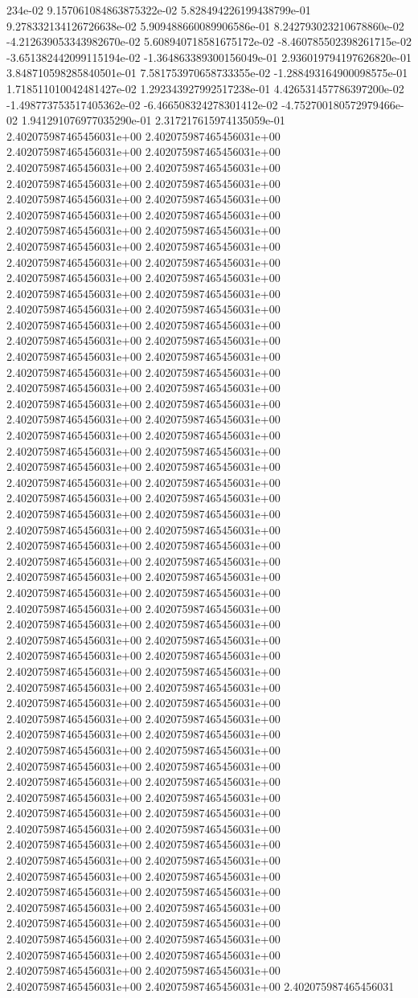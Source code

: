 234e-02	9.157061084863875322e-02	5.828494226199438799e-01	9.278332134126726638e-02	5.909488660089906586e-01	8.242793023210678860e-02	-4.212639053343982670e-02	5.608940718581675172e-02	-8.460785502398261715e-02	-3.651382442099115194e-02	-1.364863389300156049e-01	2.936019794197626820e-01	3.848710598285840501e-01	7.581753970658733355e-02	-1.288493164900098575e-01	1.718511010042481427e-02	1.292343927992517238e-01	4.426531457786397200e-02	-1.498773753517405362e-02	-6.466508324278301412e-02	-4.752700180572979466e-02	1.941291076977035290e-01	2.317217615974135059e-01
2.402075987465456031e+00	2.402075987465456031e+00	2.402075987465456031e+00	2.402075987465456031e+00	2.402075987465456031e+00	2.402075987465456031e+00	2.402075987465456031e+00	2.402075987465456031e+00	2.402075987465456031e+00	2.402075987465456031e+00	2.402075987465456031e+00	2.402075987465456031e+00	2.402075987465456031e+00	2.402075987465456031e+00	2.402075987465456031e+00	2.402075987465456031e+00	2.402075987465456031e+00	2.402075987465456031e+00	2.402075987465456031e+00	2.402075987465456031e+00	2.402075987465456031e+00	2.402075987465456031e+00	2.402075987465456031e+00	2.402075987465456031e+00	2.402075987465456031e+00	2.402075987465456031e+00	2.402075987465456031e+00	2.402075987465456031e+00	2.402075987465456031e+00	2.402075987465456031e+00	2.402075987465456031e+00	2.402075987465456031e+00	2.402075987465456031e+00	2.402075987465456031e+00	2.402075987465456031e+00	2.402075987465456031e+00	2.402075987465456031e+00	2.402075987465456031e+00	2.402075987465456031e+00	2.402075987465456031e+00	2.402075987465456031e+00	2.402075987465456031e+00	2.402075987465456031e+00	2.402075987465456031e+00	2.402075987465456031e+00	2.402075987465456031e+00	2.402075987465456031e+00	2.402075987465456031e+00	2.402075987465456031e+00	2.402075987465456031e+00	2.402075987465456031e+00	2.402075987465456031e+00	2.402075987465456031e+00	2.402075987465456031e+00	2.402075987465456031e+00	2.402075987465456031e+00	2.402075987465456031e+00	2.402075987465456031e+00	2.402075987465456031e+00	2.402075987465456031e+00	2.402075987465456031e+00	2.402075987465456031e+00	2.402075987465456031e+00	2.402075987465456031e+00	2.402075987465456031e+00	2.402075987465456031e+00	2.402075987465456031e+00	2.402075987465456031e+00	2.402075987465456031e+00	2.402075987465456031e+00	2.402075987465456031e+00	2.402075987465456031e+00	2.402075987465456031e+00	2.402075987465456031e+00	2.402075987465456031e+00	2.402075987465456031e+00	2.402075987465456031e+00	2.402075987465456031e+00	2.402075987465456031e+00	2.402075987465456031e+00	2.402075987465456031e+00	2.402075987465456031e+00	2.402075987465456031e+00	2.402075987465456031e+00	2.402075987465456031e+00	2.402075987465456031e+00	2.402075987465456031e+00	2.402075987465456031e+00	2.402075987465456031e+00	2.402075987465456031e+00	2.402075987465456031e+00	2.402075987465456031e+00	2.402075987465456031e+00	2.402075987465456031e+00	2.402075987465456031e+00	2.402075987465456031e+00	2.402075987465456031e+00	2.402075987465456031e+00	2.402075987465456031e+00	2.402075987465456031e+00	2.402075987465456031e+00	2.402075987465456031e+00	2.402075987465456031e+00	2.402075987465456031e+00	2.402075987465456031e+00	2.402075987465456031e+00	2.402075987465456031e+00	2.402075987465456031e+00	2.402075987465456031e+00	2.402075987465456031e+00	2.402075987465456031